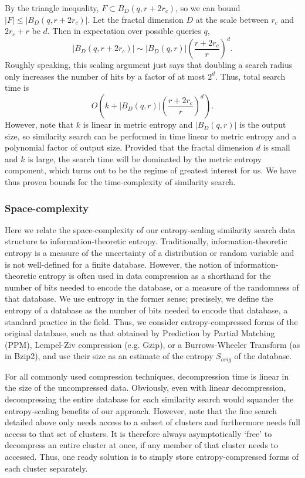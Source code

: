 \documentclass[review,preprint,12pt]{elsarticle}
\theoremstyle{definition}
\theoremstyle{remark}
\begin{document}
By the triangle inequality, $F \subset B_D(q,r+2r_c)$,
so we can bound $|F| \le |B_D(q,r+2r_c)|$.
Let the fractal dimension $D$ at the scale between $r_c$ and $2r_c + r$ be $d$.
Then in expectation over possible queries $q$,
\[
    \left|B_D(q, r+2r_c)\right| \sim \left|B_D(q,r)\right|\left(\frac{r+2r_c}{r}\right)^d .
\]
Roughly speaking, this scaling argument just says that doubling a search radius only increases the number of hits by a factor of at most $2^d$.
Thus, total search time is 
\[
    O\left(k + \left|B_D(q,r)\right|\left(\frac{r+2r_c}{r}\right)^d \right).
\]
However, note that $k$ is linear in metric entropy and $|B_D(q,r)|$ is the output size, so similarity search can be performed in time linear to metric entropy and a polynomial factor of output size.
Provided that the fractal dimension $d$ is small and $k$ is large, the search time will be dominated by the metric entropy component, which turns out to be the regime of greatest interest for us.
We have thus proven bounds for the time-complexity of similarity search.

\subsubsection{Space-complexity}
Here we relate the space-complexity of our entropy-scaling similarity search data structure to information-theoretic entropy.
Traditionally, information-theoretic entropy is a measure of the uncertainty of a distribution or random variable and is not well-defined for a finite database.
However, the notion of information-theoretic entropy is often used in data compression as a shorthand for the number of bits needed to encode the database, or a measure of the randomness of that database.
We use entropy in the former sense; precisely, we define the entropy of a database as the number of bits needed to encode that database, a standard practice in the field.
Thus, we consider entropy-compressed forms of the original database, such as that obtained by Prediction by Partial Matching (PPM), Lempel-Ziv compression (e.g. Gzip), or a Burrows-Wheeler Transform (as in Bzip2), and use their size as an estimate of the entropy $S_{orig}$ of the database.

For all commonly used compression techniques, decompression time is linear in the size of the uncompressed data.
Obviously, even with linear decompression, decompressing the entire database for each similarity search would squander the entropy-scaling benefits of our
approach.
However, note that the fine search detailed above only needs access to a subset of clusters and furthermore needs full access to that set of clusters.
It is therefore always asymptotically `free' to decompress an entire cluster at once, if any member of that cluster needs to accessed.
Thus, one ready solution is to simply store entropy-compressed forms of each cluster separately.
\end{document}
